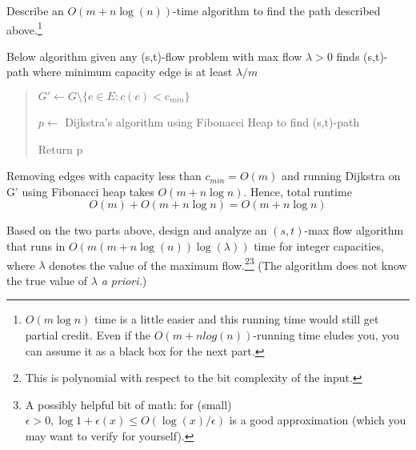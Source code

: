 \documentclass{article}
\begin{document}
\begin{subexercise}
  Describe an \( O(m+n\log(n)) \)-time algorithm to find the path described above.\footnote[4]{\( O(m\log n) \) time is a little easier and this running time would still get partial credit.
    Even if the \( O(m + n log(n)) \)-running time eludes you, you can assume it as a black box for the next part.}
\end{subexercise}

\begin{solution} Below algorithm given any (s,t)-flow problem with max flow $\lambda>0$ finds (s,t)-path where minimum capacity edge is at least $\lambda/m$
\begin{quote}%

\begin{steps}
    \item $G' \leftarrow G\setminus \{e\in E: c(e)<c_{min}\}$
    \item $p \leftarrow$ Dijkstra's algorithm using Fibonacci Heap to find (s,t)-path
    \item Return p 
    \end{steps}
\end{quote}
\begin{subproof}[Runtime]
    Removing edges with capacity less than $c_{min} = O(m)$ and running Dijkstra on G' using Fibonacci heap takes $O(m+n\log n)$. Hence, total runtime \[O(m) + O(m+n\log n) = O(m+n\log n)\]
\end{subproof}
\end{solution}
\pagebreak

\begin{subexercise}
  Based on the two parts above, design and analyze an $(s,t)$-max flow algorithm that runs in $O(m(m+n\log(n))\log(\lambda))$ time for integer capacities, where $\lambda$ denotes the value of the maximum flow.\footnote[5]{This is polynomial with respect to the bit complexity of the input.}\footnote[6]{A possibly helpful bit of math: for (small) $\epsilon > 0, \log1+\epsilon(x) \leq O(\log(x)/\epsilon)$ is a good approximation (which you may want to verify for yourself).} (The algorithm does not know the true value of $\lambda$\textit{ a priori.})
\end{subexercise}
\end{document}

